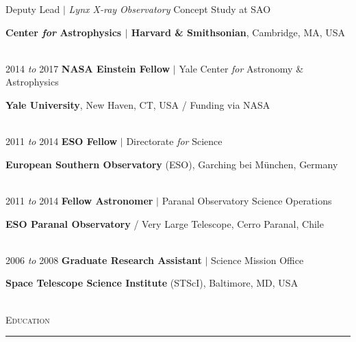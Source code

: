 \documentclass[11pt]{article}
\makeatletter
\def\vhrulefill#1{\leavevmode\leaders\hrule\@height#1\hfill \kern\z@}
\makeatother
\begin{document}
\hspace{42mm} \parbox{5.15in}{Deputy Lead $|$ \textit{Lynx X-ray Observatory} Concept Study at SAO}



\hspace{42mm} \parbox{5.15in}{ \textbf{Center \textit{for} Astrophysics $|$ Harvard \& Smithsonian}, Cambridge, MA, USA}\\


\hspace{2.5mm} 2014 \textit{to} 2017 \hspace{17mm} \textbf{NASA Einstein Fellow}
$|$ Yale Center \textit{for} Astronomy \& Astrophysics

\hspace{42mm} \parbox{5.15in}{\textbf{Yale University}, New Haven, CT, USA / Funding via NASA}\\



\hspace{2.5mm} 2011 \textit{to} 2014 \hspace{17mm} \textbf{ESO Fellow} $|$ Directorate \textit{for} Science

\hspace{42mm} \parbox{5.15in}{\textbf{European Southern Observatory} (ESO), Garching bei M\"{u}nchen, Germany}\\




\hspace{2.5mm} 2011 \textit{to} 2014 \hspace{17mm} \textbf{Fellow Astronomer} $|$ Paranal Observatory Science Operations

\hspace{42mm} \parbox{5.15in}{\textbf{ESO Paranal Observatory} / Very Large Telescope, Cerro Paranal, Chile} \\



\hspace{2.5mm} 2006 \textit{to} 2008 \hspace{17mm} \textbf{Graduate Research Assistant} $|$ Science Mission Office

\hspace{42mm} \parbox{5.15in}{\textbf{Space Telescope Science Institute} (STScI), Baltimore, MD, USA} \\



\textsc{Education} \vhrulefill{0.4pt}

\vspace{2mm}
\end{document}
